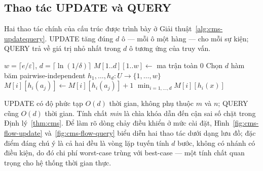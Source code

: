 \subsection{Thao tác UPDATE và QUERY}

Hai thao tác chính của cấu trúc được trình bày ở Giải thuật~\ref{alg:cms-updatequery}. UPDATE tăng đúng $d$ ô --- mỗi ô một hàng --- cho mỗi sự kiện; QUERY trả về giá trị nhỏ nhất trong $d$ ô tương ứng của truy vấn.

\begin{algorithm}[H]
\caption{Count-Min Sketch --- UPDATE và QUERY}
\label{alg:cms-updatequery}
\begin{algorithmic}[1]
\Require $w = \lceil e/\varepsilon \rceil$, $d = \lceil \ln(1/\delta) \rceil$
\State $M[1..d][1..w] \gets$ ma trận toàn 0
\State Chọn $d$ hàm băm pairwise-independent $h_1, \ldots, h_d: U \to \{1, \ldots, w\}$
\Statex
{}
        \State $M[i][h_i(a_j)] \gets M[i][h_i(a_j)] + 1$
    \EndFor
\EndFunction
\Statex
{}
    \State \Return $\displaystyle \min_{i = 1, \ldots, d} M[i][h_i(x)]$
\EndFunction
\end{algorithmic}
\end{algorithm}

UPDATE có độ phức tạp $O(d)$ thời gian, không phụ thuộc $m$ và $n$; QUERY cũng $O(d)$ thời gian. Tính chất \textit{min} là chìa khóa dẫn đến cận sai số chặt trong Định lý~\ref{thm:cms}. Để làm rõ dòng chảy điều khiển ở mức cài đặt, Hình~\ref{fig:cms-flow-update} và~\ref{fig:cms-flow-query} biểu diễn hai thao tác dưới dạng lưu đồ; đặc điểm đáng chú ý là cả hai đều là vòng lặp tuyến tính $d$ bước, không có nhánh có điều kiện, do đó chi phí worst-case trùng với best-case --- một tính chất quan trọng cho hệ thống thời gian thực.

